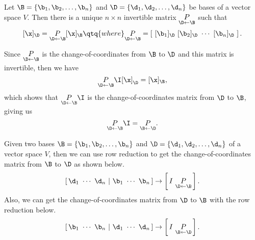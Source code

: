 \begin{theorem}
  \label{thm:unique_invertible_matrix_between_two_bases}

  Let $\B = \{\b_1, \b_2, \ldots, \b_n\}$ and $\D = \{\d_1, \d_2, \ldots,
  \d_n\}$ be bases of a vector space $V$. Then there is a unique $n \times n$
  invertible matrix $\underset{\D \leftarrow \B}{P}$ such that
  \[%
    [\x]_\D = \underset{\D \leftarrow \B}{P}[\x]_\B \qtq{where} \underset{\D \leftarrow \B}{P} = \left[~[\b_1]_\D~[\b_2]_\D~\cdots~[\b_n]_\D~\right]
  .\]%
\end{theorem}

Since $\underset{\D \leftarrow \B}{P}$ is the change-of-coordinates from $\B$ to
$\D$ and this matrix is invertible, then we have
\[%
  \underset{\D \leftarrow \B}{P}\I[\x]_\D = [\x]_\B
,\]%
which shows that $\underset{\D \leftarrow \B}{P}\I$ is the change-of-coordinates
matrix from $\D$ to $\B$, giving us
\[%
  \underset{\D \leftarrow \B}{P}\I = \underset{\B \leftarrow \D}{P}
.\]%

Given two bases $\B = \{\b_1, \b_2, \ldots, \b_n\}$ and $\D = \{\d_1, \d_2,
\ldots, \d_n\}$ of a vector space $V$, then we can use row reduction to get the
change-of-coordinates matrix from $\B$ to $\D$ as shown below.
\[%
  [\,\d_1~\cdots~\d_n~\vert~\b_1~\cdots~\b_n\,] \rightarrow \left[\,I~\underset{\D \leftarrow \B}{P}\,\right]
.\]%
Also, we can get the change-of-coordinates matrix from $\D$ to $\B$ with the row
reduction below.
\[%
  [\,\b_1~\cdots~\b_n~\vert~\d_1~\cdots~\d_n\,] \rightarrow \left[\,I~\underset{\B \leftarrow \D}{P}\,\right]
.\]%

